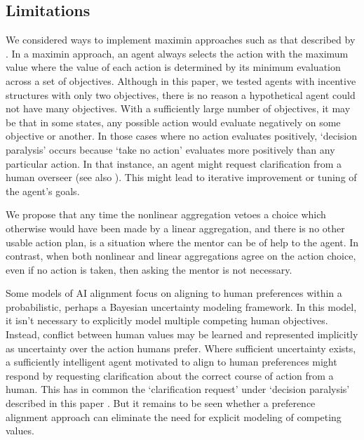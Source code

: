 \subsection{Limitations}

We considered ways to implement maximin approaches such as that described by \cite{vamplew_human-aligned_2018}. In a maximin approach, an agent always selects the action with the maximum value where the value of each action is determined by its minimum evaluation across a set of objectives. Although in this paper, we tested agents with incentive structures with only two objectives, there is no reason a hypothetical agent could not have many objectives. With a sufficiently large number of objectives, it may be that in some states, any possible action would evaluate negatively on some objective or another. In those cases where no action evaluates positively, `decision paralysis' occurs because `take no action' evaluates more positively than any particular action. %
 In that instance, an agent might request clarification from a human overseer (see also \cite{pmlr-v125-cohen20a}). This might lead to iterative improvement or tuning of the agent's goals.

We propose that any time the nonlinear aggregation vetoes a choice which otherwise would have been made by a linear aggregation, and there is no other usable action plan, is a situation where the mentor can be of help to the agent. %
In contrast, when both nonlinear and linear aggregations agree on the action choice, even if no action is taken, then asking the mentor is not necessary.

Some models of AI alignment focus on \cite{russell2019human} aligning to human preferences within a probabilistic, perhaps a Bayesian uncertainty modeling framework.  In this model, it isn't necessary to explicitly model multiple competing human objectives. Instead, conflict between human values may be learned and represented implicitly as uncertainty over the action humans prefer. Where sufficient uncertainty exists, a sufficiently intelligent agent motivated to align to human preferences might respond by requesting clarification about the correct course of action from a human. This has in common the `clarification request' under `decision paralysis' described in this paper%
. But it remains to be seen whether a preference alignment approach can eliminate the need for explicit modeling of competing values.

